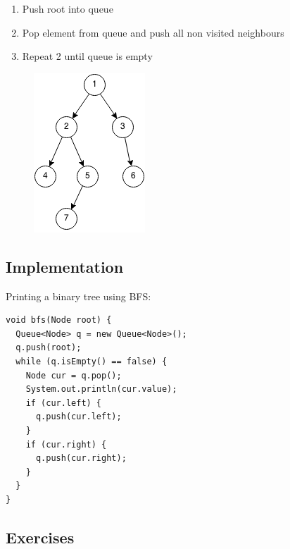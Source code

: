 \documentclass[11pt,oneside]{book}
\makeatletter
\def\maxwidth#1{\ifdim\Gin@nat@width>#1 #1\else\Gin@nat@width\fi}
\makeatother
\begin{document}
\begin{enumerate}
\item Push root into queue
\item Pop element from queue and push all non visited neighbours
\item Repeat 2 until queue is empty
\end{enumerate}

\vspace{5px}\begin{figure}[H]\centering
        \includegraphics[width=0.66\maxwidth{\textwidth}]{bfs.png}
        \end{figure}

\subsection{Implementation}

Printing a binary tree using BFS:

\begin{lstlisting}
void bfs(Node root) {
  Queue<Node> q = new Queue<Node>();
  q.push(root);
  while (q.isEmpty() == false) {
    Node cur = q.pop();
    System.out.println(cur.value);
    if (cur.left) {
      q.push(cur.left);
    }
    if (cur.right) {
      q.push(cur.right);
    }
  }
}
\end{lstlisting}

\subsection{Exercises}
\end{document}
